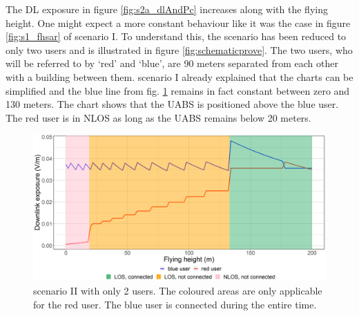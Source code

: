 The \gls{DL} exposure in figure \ref{fig:s2a_dlAndPc} increases along with the flying height. One might expect a more constant 
behaviour like it was the case in figure \ref{fig:s1_fhsar} of scenario I. To understand this, the scenario has been reduced  
to only two users and is illustrated in figure \ref{fig:schematicprove}.
The two users, who will be referred to by `red' and `blue', are 90 meters separated from each other with a building between them.
scenario I already explained that the charts can be simplified and the blue line from fig. \ref{fig:prove} remains in fact constant between zero and 130 meters.
The chart shows that the \gls{UABS} is positioned above the blue user. The red user is in \gls{NLOS} as long as the \gls{UABS} remains below 20 meters.

\begin{figure}[]
  \includegraphics[width=\textwidth]{../results/s2/prove.png}
  \caption{scenario II with only 2 users. The coloured areas are only applicable for the red user. 
  The blue user is connected during the entire time.}
  \label{fig:prove}
\end{figure}

